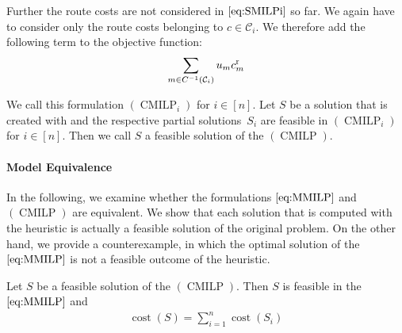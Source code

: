 Further the route costs are not considered in $\eqref{eq:SMILPi}$ so far. We again have to consider only the route costs belonging to $c\in\mathcal{C}_i$. We therefore add the following term to the objective function:
\begin{align*}
	\sum_{m\in C^{-1}\left(\mathcal{C}_i\right)} u_m c^{\operatorname{r}}_m
\end{align*}

We call this formulation $(\operatorname{CMILP}_i)$ for $i\in[n]$. Let $S$ be a solution that is created with  and the respective partial solutions~$S_i$ are feasible in $(\operatorname{CMILP}_i)$ for ${i\in[n]}$. Then we call $S$ a feasible solution of the $(\operatorname{CMILP})$.

\paragraph{Model Equivalence} \parfill

In the following, we examine whether the formulations $\eqref{eq:MMILP}$ and $(\operatorname{CMILP})$ are equivalent. We show that each solution that is computed with the heuristic is actually a feasible solution of the original problem. On the other hand, we provide a counterexample, in which the optimal solution of the $\eqref{eq:MMILP}$ is not a feasible outcome of the heuristic.

\begin{theorem}
\label{thm:equivalence_CMILP_MMILP}

Let $S$ be a feasible solution of the $(\operatorname{CMILP})$. Then $S$ is feasible in the $\eqref{eq:MMILP}$ and
\begin{align*}
	\operatorname{cost}\left(S\right) = \sum_{i=1}^n\operatorname{cost}\left(S_i\right)
\end{align*}

\end{theorem}

